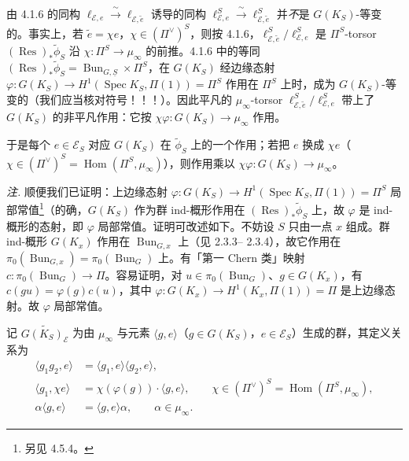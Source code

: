 由 4.1.6 的同构 $\ell_{\mathcal{E},e}\xrightarrow{\ \sim\ }\ell_{\mathcal{E},\tilde e}$ 诱导的同构 $\ell^S_{\mathcal{E},e}\xrightarrow{\ \sim\ }\ell^S_{\mathcal{E},\tilde e}$ 并\emph{不}是 $G(K_S)$-等变的。事实上，若 $\tilde e=\chi e$，$\chi\in(\Pi^{\vee})^S$，则按 4.1.6，$\ell^S_{\mathcal{E},\tilde e}/\ell^S_{\mathcal{E},e}$ 是 $\Pi^S$-torsor $(\operatorname{Res})_*\tilde\phi_S$ 沿 $\chi:\Pi^S\to\mu_\infty$ 的前推。4.1.6 中的等同 $(\operatorname{Res})_*\tilde\phi_S=\operatorname{Bun}_{G,\underline{S}}\times\Pi^S$，在 $G(K_S)$ 经边缘态射 $\varphi:G(K_S)\to H^1(\operatorname{Spec} K_S,\Pi(1))=\Pi^S$ 作用在 $\Pi^S$ 上时，成为 $G(K_S)$-等变的（我们应当核对符号！！！）。因此平凡的 $\mu_\infty$-torsor $\ell^S_{\mathcal{E},\tilde e}/\ell^S_{\mathcal{E},e}$ 带上了 $G(K_S)$ 的非平凡作用：它按 $\chi\varphi:G(K_S)\to\mu_\infty$ 作用。

于是每个 $e\in\mathcal{E}_S$ 对应 $G(K_S)$ 在 $\tilde\phi_S$ 上的一个作用；若把 $e$ 换成 $\chi e$（$\chi\in(\Pi^{\vee})^S=\operatorname{Hom}(\Pi^S,\mu_\infty)$），则作用乘以 $\chi\varphi:G(K_S)\to\mu_\infty$。

\emph{注.} 顺便我们已证明：上边缘态射 $\varphi:G(K_S)\to H^1(\operatorname{Spec} K_S,\Pi(1))=\Pi^S$ 局部常值\footnote{另见 4.5.4。}（的确，$G(K_S)$ 作为群 ind-概形作用在 $(\operatorname{Res})_*\tilde\phi_S$ 上，故 $\varphi$ 是 ind-概形的态射，即 $\varphi$ 局部常值。证明可改述如下。不妨设 $S$ 只由一点 $x$ 组成。群 ind-概形 $G(K_x)$ 作用在 $\operatorname{Bun}_{G,x}$ 上（见 2.3.3--%
%
2.3.4），故它作用在 $\pi_0(\operatorname{Bun}_{G,x})=\pi_0(\operatorname{Bun}_G)$ 上。有「第一 Chern 类」映射 $c:\pi_0(\operatorname{Bun}_G)\to\Pi$。容易证明，对 $u\in\pi_0(\operatorname{Bun}_G)$、$g\in G(K_x)$，有 $c(gu)=\varphi(g)c(u)$，其中 $\varphi:G(K_x)\to H^1(K_x,\Pi(1))=\Pi$ 是上边缘态射。故 $\varphi$ 局部常值。

 记 $\widetilde{G(K_S)_{\mathcal{E}}}$ 为由 $\mu_\infty$ 与元素 $\langle g,e\rangle$（$g\in G(K_S)$，$e\in\mathcal{E}_S$）生成的群，其定义关系为
\[
\begin{aligned}
\langle g_1g_2,e\rangle&=\langle g_1,e\rangle\langle g_2,e\rangle,\\
\langle g_1,\chi e\rangle&=\chi(\varphi(g))\cdot\langle g,e\rangle,\qquad \chi\in(\Pi^{\vee})^S=\operatorname{Hom}(\Pi^S,\mu_\infty),\\
\alpha\langle g,e\rangle&=\langle g,e\rangle\alpha,\qquad \alpha\in\mu_\infty.
\end{aligned}
\]

